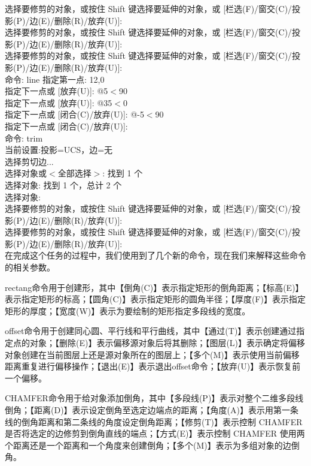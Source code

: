 选择要修剪的对象，或按住 Shift 键选择要延伸的对象，或
[栏选(F)/窗交(C)/投影(P)/边(E)/删除(R)/放弃(U)]:\\
选择要修剪的对象，或按住 Shift 键选择要延伸的对象，或
[栏选(F)/窗交(C)/投影(P)/边(E)/删除(R)/放弃(U)]:\\
选择要修剪的对象，或按住 Shift 键选择要延伸的对象，或
[栏选(F)/窗交(C)/投影(P)/边(E)/删除(R)/放弃(U)]:\\
命令: line 指定第一点: 12,0\\
指定下一点或 [放弃(U)]: @5$<$90\\
指定下一点或 [放弃(U)]: @35$<$0\\
指定下一点或 [闭合(C)/放弃(U)]:   @-5$<$90\\
指定下一点或 [闭合(C)/放弃(U)]:\\
命令: trim\\
当前设置:投影=UCS，边=无\\
选择剪切边...\\
选择对象或$ <$全部选择$>$:  找到 1 个\\
选择对象: 找到 1 个，总计 2 个\\
选择对象:\\
选择要修剪的对象，或按住 Shift 键选择要延伸的对象，或
[栏选(F)/窗交(C)/投影(P)/边(E)/删除(R)/放弃(U)]:\\
选择要修剪的对象，或按住 Shift 键选择要延伸的对象，或
[栏选(F)/窗交(C)/投影(P)/边(E)/删除(R)/放弃(U)]:\\
\indent
在完成这个任务的过程中，我们使用到了几个新的命令，现在我们来解释这些命令的相关参数。

 rectang命令用于创建形，其中【倒角(C)】表示指定矩形的倒角距离；【标高(E)】表示指定矩形的标高；【圆角(C)】表示指定矩形的圆角半径；【厚度(F)】表示指定矩形的厚度；【宽度(W)】表示为要绘制的矩形指定多段线的宽度。
 
offset命令用于创建同心圆、平行线和平行曲线，其中【通过(T)】表示创建通过指定点的对象；【删除(E)】表示偏移源对象后将其删除；【图层(L)】表示确定将偏移对象创建在当前图层上还是源对象所在的图层上；【多个(M)】表示使用当前偏移距离重复进行偏移操作；【退出(E)】表示退出offset命令；【放弃(U)】表示恢复前一个偏移。

 CHAMFER命令用于给对象添加倒角，其中【多段线(P)】表示对整个二维多段线倒角；【距离(D)】表示设定倒角至选定边端点的距离；【角度(A)】表示用第一条线的倒角距离和第二条线的角度设定倒角距离；【修剪(T)】表示控制 CHAMFER 是否将选定的边修剪到倒角直线的端点；【方式(E)】表示控制 CHAMFER 使用两个距离还是一个距离和一个角度来创建倒角；【多个(M)】表示为多组对象的边倒角。

